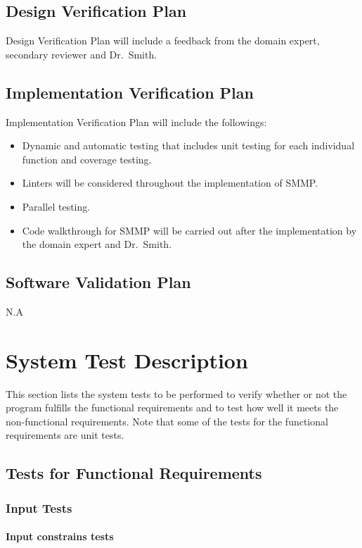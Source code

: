 \documentclass[12pt, titlepage]{article}
\begin{document}
\subsection{Design Verification Plan}

Design Verification Plan will include a feedback from the domain expert,
secondary reviewer and Dr.\ Smith.

\subsection{Implementation Verification Plan}

Implementation Verification Plan will include the followings:
\begin{itemize}
\item Dynamic and automatic testing that includes unit testing for each
individual function and coverage testing.
\item Linters will be considered throughout the implementation of SMMP.
\item Parallel testing.
\item Code walkthrough for SMMP will be carried out after the implementation by
the domain expert and Dr.\ Smith.
\end{itemize}

\subsection{Software Validation Plan} N.A

\section{System Test Description}

This section lists the system tests to be performed to verify whether or not the
program fulfills the functional requirements and to test how well it meets the
non-functional requirements. Note that some of the tests for the functional
requirements are unit tests.

\subsection{Tests for Functional Requirements}

\subsubsection{Input Tests}

\paragraph{Input constrains tests}
\end{document}
